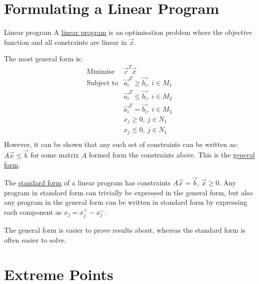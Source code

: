 \documentclass[../Main.tex]{subfiles}
\begin{document}
\section{Formulating a Linear Program}
\begin{definition}{Linear program}
    A \underline{linear program} is an optimisation problem where the objective function and all constraints are linear in $\vec{x}$.
\end{definition}
The most general form is:
\begin{align*}
    \text{Minimise } &\vec{c}^T\vec{x} \\
    \text{Subject to} &\vec{a_i}^T \geq \vec{b_i},~i \in M_1 \\
    &\vec{a_i}^T \leq \vec{b_i},~i \in M_2 \\
    &\vec{a_i}^T = \vec{b_i},~i \in M_3 \\
    &x_j \geq 0,~j \in N_1 \\
    &x_j \leq 0,~j \in N_1 \\
\end{align*}
However, it can be shown that any such set of constraints can be written as: $A\vec{x} \leq \vec{b}$ for some matrix $A$ formed form the constraints above. This is the \underline{general form}.

The \underline{standard form} of a linear program has constraints $A\vec{x} = \vec{b}$, $\vec{x} \geq 0$. Any program in standard form can trivially be expressed in the general form, but also any program in the general form can be written in standard form by expressing each component as $x_j = x_j^+ - x_j^-$.

The general form is easier to prove results about, whereas the standard form is often easier to solve.
\section{Extreme Points}
\end{document}

